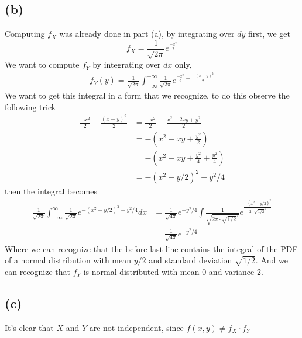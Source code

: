 \documentclass[a4paper,11pt]{article}
\begin{document}
	\subsection*{(b)}
	Computing $f_X$ was already done in part (a), by integrating over $dy$ first, we get 
	$$
		f_X = \frac{1}{\sqrt{2\pi}} e^{\frac{-x^2}{2}}
	$$
	We want to compute $f_Y$ by integrating over $dx$ only, 
	\begin{align*}
		f_Y(y) = \frac{1}{\sqrt{2\pi}}\int_{-\infty}^{+\infty} \frac{1}{\sqrt{2\pi}} e^{\frac{-x^2}{2} - \frac{-(x-y)^2}{2}}
	\end{align*}
	We want to get this integral in a form that we recognize, to do this observe the following trick
	\begin{align*}
		\frac{-x^2}{2} - \frac{(x-y)^2}{2} &= \frac{-x^2}{2} - \frac{x^2-2xy+y^2}{2}\\
						   &= -(x^2 - xy + \frac{y^2}{2})\\
						   &= -( x^2 - xy + \frac{y^2}{4} + \frac{y^2}{4} )\\
						   &= -(x^2 - y/2)^2 - y^2/4
	\end{align*}
	then the integral becomes
	\begin{align*}
		\frac{1}{\sqrt{2\pi}} \int_{-\infty}^{\infty} \frac{1}{\sqrt{2\pi}} e^{-(x^2-y/2)^2 - y^2/4} dx &= \frac{1}{\sqrt{4\pi}}e^{-y^2/4} \int \frac{1}{\sqrt{2\pi \cdot \sqrt{1/2}^2}} e^{\frac{-(x^2-y/2)^2}{2 \cdot \sqrt{1/2}^2}}\\
		&= \frac{1}{\sqrt{4\pi}} e^{-y^2/4}
	\end{align*}
	Where we can recognize that the before last line contains the integral of the PDF of a normal distribution with mean $y/2$ and standard deviation $\sqrt{1/2}$. And we can recognize that $f_Y$ is normal distributed with mean $0$ and variance $2$. 
	\subsection*{(c)} It's clear that $X$ and $Y$ are not independent, since $f(x,y) \neq f_X \cdot f_Y$
	

	


\clearpage
\end{document}
